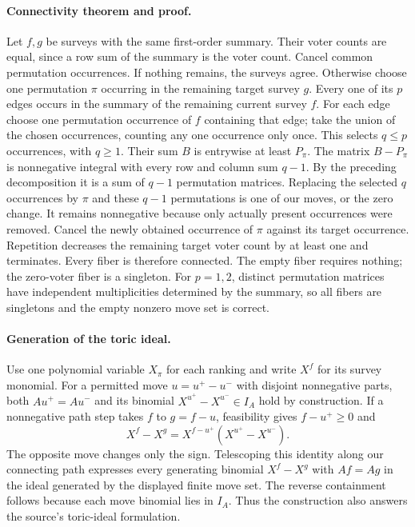 \documentclass[11pt]{article}
\begin{document}
\paragraph{Connectivity theorem and proof.}
Let $f,g$ be surveys with the same first-order summary. Their voter counts
are equal, since a row sum of the summary is the voter count. Cancel
common permutation occurrences. If nothing remains, the surveys agree.
Otherwise choose one permutation $\pi$ occurring in the remaining target
survey $g$. Every one of its $p$ edges occurs in the summary of the
remaining current survey $f$. For each edge choose one permutation
occurrence of $f$ containing that edge; take the union of the chosen
occurrences, counting any one occurrence only once. This selects
$q\le p$ occurrences, with $q\ge1$. Their sum $B$ is entrywise at least
$P_\pi$. The matrix $B-P_\pi$ is nonnegative integral with every row and
column sum $q-1$. By the preceding decomposition it is a sum of $q-1$
permutation matrices. Replacing the selected $q$ occurrences by $\pi$
and these $q-1$ permutations is one of our moves, or the zero change.
It remains nonnegative because only actually present occurrences were
removed. Cancel the newly obtained occurrence of $\pi$ against its target
occurrence. Repetition decreases the remaining target voter count by at
least one and terminates. Every fiber is therefore connected.
The empty fiber requires nothing; the zero-voter fiber is a singleton.
For $p=1,2$, distinct permutation matrices have independent multiplicities
determined by the summary, so all fibers are singletons and the empty
nonzero move set is correct.

\paragraph{Generation of the toric ideal.}
Use one polynomial variable $X_\pi$ for each ranking and write $X^f$
for its survey monomial. For a permitted move $u=u^+-u^-$ with disjoint
nonnegative parts, both $Au^+=Au^-$ and its binomial
$X^{u^+}-X^{u^-}\in I_A$ hold by construction. If a nonnegative path
step takes $f$ to $g=f-u$, feasibility gives $f-u^+\ge0$ and
\[
X^f-X^g=X^{f-u^+}(X^{u^+}-X^{u^-}).
\]
The opposite move changes only the sign. Telescoping this identity along
our connecting path expresses every generating binomial $X^f-X^g$
with $Af=Ag$ in the ideal generated by the displayed finite move set.
The reverse containment follows because each move binomial lies in $I_A$.
Thus the construction also answers the source's toric-ideal formulation.
\end{document}
